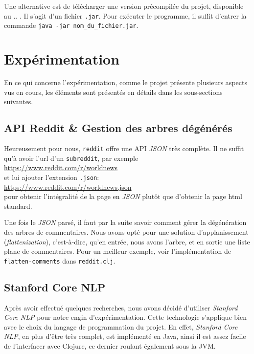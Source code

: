 \documentclass[12pt]{article}
\begin{document}
Une alternative est de télécharger une version précompilée du projet, disponible au .. . Il s'agit d'un fichier \verb;.jar;. Pour exécuter le programme, il
suffit d'entrer la commande \verb;java -jar nom_du_fichier.jar;.

\section{Expérimentation}

En ce qui concerne l'expérimentation, comme le projet présente plusieurs aspects vus en cours, les éléments sont présentés en détails dans les sous-sections suivantes.

\subsection{API Reddit \& Gestion des arbres dégénérés}
\label{sec:api-reddit}

Heureusement pour nous, \verb;reddit; offre une API \textit{JSON} très complète. Il ne suffit qu'à avoir l'url d'un \verb;subreddit;, par exemple\\

\url{https://www.reddit.com/r/worldnews}\\

et lui ajouter l'extension \verb;.json;:\\

\url{https://www.reddit.com/r/worldnews.json}\\

pour obtenir l'intégralité de la page en \textit{JSON} plutôt que d'obtenir la page html standard.

Une fois le \textit{JSON} parsé, il faut par la suite savoir comment gérer la dégénération des arbres de commentaires. Nous avons opté pour une solution d'applanissement (\textit{flattenization}), c'est-à-dire, qu'en entrée, nous avons l'arbre, et en sortie une liste plane de commentaires. Pour un meilleur exemple, voir l'implémentation de \verb;flatten-comments; dans \verb;reddit.clj;.

\subsection{Stanford Core NLP}

Après avoir effectué quelques recherches, nous avons décidé d'utiliser \textit{Stanford Core NLP} pour notre engin d'expérimentation. Cette technologie s'applique bien avec le choix du langage de programmation du projet. En effet, \textit{Stanford Core NLP}, en plus d'être très complet, est implémenté en Java, ainsi il est assez facile de l'interfacer avec Clojure, ce dernier roulant également sous la JVM.
\end{document}
